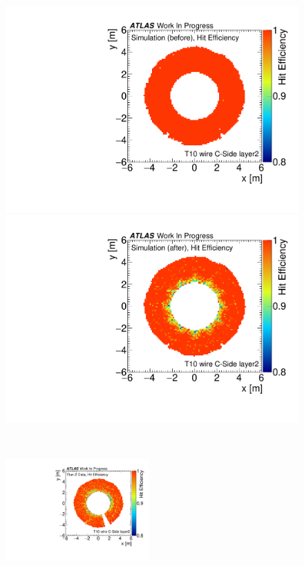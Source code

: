 \begin{figure}[H]
	\begin{minipage}{0.49\hsize}
	\centering
	\includegraphics[width=\textwidth,page=1]{img/plot/hit_eff_orin.pdf}
	\subcaption{}
	\end{minipage}
	\begin{minipage}{0.49\hsize}
	\centering
	\includegraphics[width=\textwidth,page=1]{img/plot/hit_eff_tune.pdf}
	\subcaption{}
	\end{minipage}\\
	\begin{minipage}{0.99\hsize}
	\centering
	\includegraphics[width=0.49\textwidth,page=1]{img/plot/hit_eff_data.pdf}

\end{minipage}
\end{figure}
